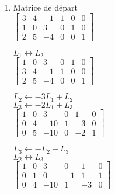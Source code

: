\begin{exercice}
\begin{sol}
\begin{enumerate}
    \item
      \begin{multicols}{2}
        Matrice de départ \\
        \columnbreak
        $%
        \left[
          \begin{array}{rrr|rrr}
            3 & 4 & -1 & 1 & 0 & 0 \\
            1 & 0 &  3 & 0 & 1 & 0 \\
            2 & 5 & -4 & 0 & 0 & 1
          \end{array}
        \right]
        $
      \end{multicols}
      \begin{multicols}{2}
        $L_1 \leftrightarrow L_2$ \\
        \columnbreak
        $%
        \left[
          \begin{array}{rrr|rrr}
            1 & 0 &  3 & 0 & 1 & 0 \\
            3 & 4 & -1 & 1 & 0 & 0 \\
            2 & 5 & -4 & 0 & 0 & 1
          \end{array}
        \right]
        $
      \end{multicols}
      \begin{multicols}{2}
        $L_2 \leftarrow -3 L_1 + L_2$ \\
        $L_3 \leftarrow -2 L_1 + L_3$ \\
        \columnbreak
        $%
        \left[
          \begin{array}{rrr|rrr}
            1 & 0 &   3 & 0 &  1 & 0 \\
            0 & 4 & -10 & 1 & -3 & 0 \\
            0 & 5 & -10 & 0 & -2 & 1
          \end{array}
        \right]
        $
      \end{multicols}
      \begin{multicols}{2}
        $L_3 \leftarrow -L_2 + L_3$ \\
        $L_2 \leftrightarrow L_3$ \\
        \columnbreak
        $%
        \left[
          \begin{array}{rrr|rrr}
            1 & 0 &   3 &  0 &  1 & 0 \\
            0 & 1 &   0 & -1 &  1 & 1 \\
            0 & 4 & -10 &  1 & -3 & 0
          \end{array}
        \right]
        $
      \end{multicols}

\end{enumerate}
\end{sol}
\end{exercice}
